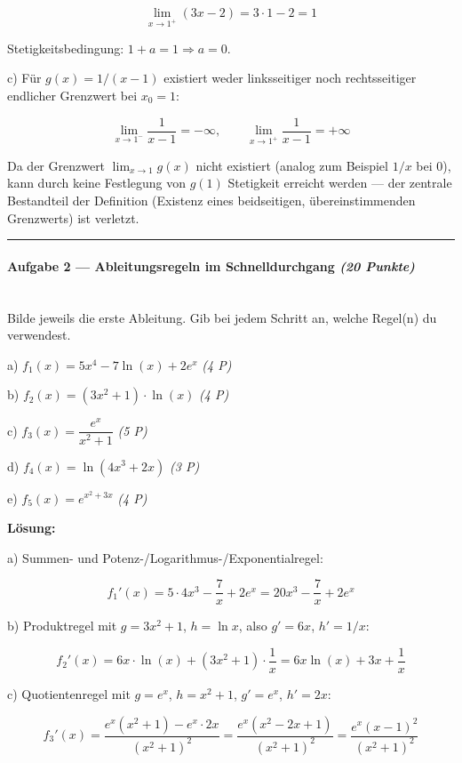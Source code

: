 \documentclass[11pt, a4paper]{article}
\begin{document}
\[
\lim_{x \to 1^+} (3x - 2) = 3 \cdot 1 - 2 = 1
\]

Stetigkeitsbedingung: $1 + a = 1 \Rightarrow \boxed{a = 0}$.


c) Für $g(x) = 1/(x-1)$ existiert weder linksseitiger noch rechtsseitiger endlicher Grenzwert bei $x_0 = 1$:

\[
\lim_{x \to 1^-} \frac{1}{x-1} = -\infty, \qquad \lim_{x \to 1^+} \frac{1}{x-1} = +\infty
\]

Da der Grenzwert $\lim_{x \to 1} g(x)$ nicht existiert (analog zum Beispiel $1/x$ bei 0), kann durch keine Festlegung von $g(1)$ Stetigkeit erreicht werden — der zentrale Bestandteil der Definition (Existenz eines beidseitigen, übereinstimmenden Grenzwerts) ist verletzt.



\noindent\textcolor{rulegray}{\rule{\linewidth}{0.4pt}}


\paragraph{Aufgabe 2 — Ableitungsregeln im Schnelldurchgang \textit{(20 Punkte)}}\mbox{}\\[2pt]

Bilde jeweils die erste Ableitung. Gib bei jedem Schritt an, welche Regel(n) du verwendest.


a) $f_1(x) = 5x^4 - 7\ln(x) + 2e^x$ \textit{(4 P)}

b) $f_2(x) = (3x^2 + 1)\cdot \ln(x)$ \textit{(4 P)}

c) $f_3(x) = \dfrac{e^x}{x^2 + 1}$ \textit{(5 P)}

d) $f_4(x) = \ln(4x^3 + 2x)$ \textit{(3 P)}

e) $f_5(x) = e^{x^2 + 3x}$ \textit{(4 P)}


\textbf{Lösung:}


a) Summen- und Potenz-/Logarithmus-/Exponentialregel:

\[
f_1'(x) = 5\cdot 4 x^3 - \frac{7}{x} + 2e^x = 20x^3 - \frac{7}{x} + 2e^x
\]


b) Produktregel mit $g = 3x^2+1$, $h = \ln x$, also $g' = 6x$, $h' = 1/x$:

\[
f_2'(x) = 6x \cdot \ln(x) + (3x^2+1)\cdot \frac{1}{x} = 6x\ln(x) + 3x + \frac{1}{x}
\]


c) Quotientenregel mit $g = e^x$, $h = x^2+1$, $g' = e^x$, $h' = 2x$:

\[
f_3'(x) = \frac{e^x(x^2+1) - e^x\cdot 2x}{(x^2+1)^2} = \frac{e^x(x^2 - 2x + 1)}{(x^2+1)^2} = \frac{e^x(x-1)^2}{(x^2+1)^2}
\]
\end{document}
